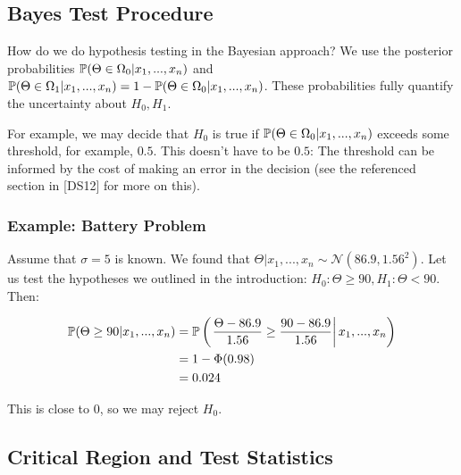 \documentclass[a4paper]{article}
\begin{document}
        \subsection{Bayes Test Procedure}
            \begin{fread}
                [DS12, section 9.8]
            \end{fread}

            How do we do hypothesis testing in the Bayesian approach? We use the
            posterior probabilities $\mathbb{P}(\Theta \in \Omega_0 | x_1, ...,
            x_n)$ and $\mathbb{P}(\Theta \in \Omega_1 | x_1, ..., x_n) = 1 - \mathbb{P}
            (\Theta \in \Omega_0 | x_1, ..., x_n)$. These probabilities fully
            quantify the uncertainty about $H_0, H_1$.

            For example, we may decide that $H_0$ is true if $\mathbb{P}(\Theta \in
            \Omega_0 | x_1, ..., x_n)$ exceeds some threshold, for example,
            $0.5$. This doesn't have to be $0.5$: The threshold can be informed
            by the cost of making an error in the decision (see the referenced
            section in [DS12] for more on this).

            \subsubsection{Example: Battery Problem}
                Assume that $\sigma = 5$ is known. We found that $\Theta | x_1,
                ..., x_n \sim \mathcal{N}(86.9, 1.56^2)$. Let us test the
                hypotheses we outlined in the introduction: $H_0: \Theta \geq
                90, H_1: \Theta < 90$. Then:

                \begin{align*}
                    \mathbb{P}(\Theta \geq 90| x_1, ..., x_n) & = \mathbb{P}\left(\left.
                        \frac{\Theta - 86.9}{1.56} \geq \frac{90 - 86.9}{1.56}
                        \right| x_1, ..., x_n\right) \\
                    & = 1 - \Phi(0.98) \\
                    & = 0.024
                \end{align*}

                This is close to 0, so we may reject $H_0$.

        \subsection{Critical Region and Test Statistics}
            \begin{fread}
                [DS12, section 9.1]
            \end{fread}
\end{document}
